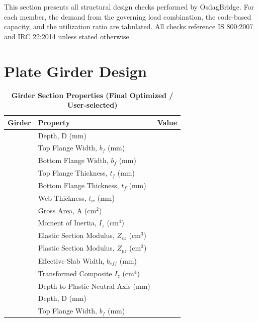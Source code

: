 \documentclass[12pt,a4paper]{report}
\numberwithin{table}{chapter}
\numberwithin{figure}{chapter}
\begin{document}
This section presents all structural design checks performed by OsdagBridge. For each member, the demand from the governing load combination, the code-based capacity, and the utilization ratio are tabulated. All checks reference IS 800:2007 and IRC 22:2014 unless stated otherwise.

\section{Plate Girder Design}
\label{sec:plate-girder}

\vspace{1em}
\begin{longtable}{|C{2.5cm}|L{8.0cm}|>{\centering\arraybackslash}p{5.0cm}|}
\caption{\textbf{Girder Section Properties (Final Optimized / User-selected)}}\\
\hline
\textbf{Girder} & \textbf{Property} & \textbf{Value} \\[6pt]
\hline
{} & \textnormal{Depth, D (mm)} &  \\[6pt]
 & \textnormal{Top Flange Width, $b_f$ (mm)} &  \\[6pt]
 & \textnormal{Bottom Flange Width, $b_f$ (mm)} &  \\[6pt]
 & \textnormal{Top Flange Thickness, $t_f$ (mm)} &  \\[6pt]
 & \textnormal{Bottom Flange Thickness, $t_f$ (mm)} &  \\[6pt]
 & \textnormal{Web Thickness, $t_w$ (mm)} &  \\[6pt]
 & \textnormal{Gross Area, A (cm$^2$)} &  \\[6pt]
 & \textnormal{Moment of Inertia, $I_z$ (cm$^4$)} &  \\[6pt]
 & \textnormal{Elastic Section Modulus, $Z_{ez}$ (cm$^3$)} &  \\[6pt]
 & \textnormal{Plastic Section Modulus, $Z_{pz}$ (cm$^3$)} &  \\[6pt]
 & \textnormal{Effective Slab Width, $b_{eff}$ (mm)} &  \\[6pt]
 & \textnormal{Transformed Composite $I_z$ (cm$^4$)} &  \\[6pt]
 & \textnormal{Depth to Plastic Neutral Axis (mm)} &  \\[6pt]
\hline
{} & \textnormal{Depth, D (mm)} &  \\[6pt]
 & \textnormal{Top Flange Width, $b_f$ (mm)} &  \\[6pt]

\end{longtable}
\end{document}
